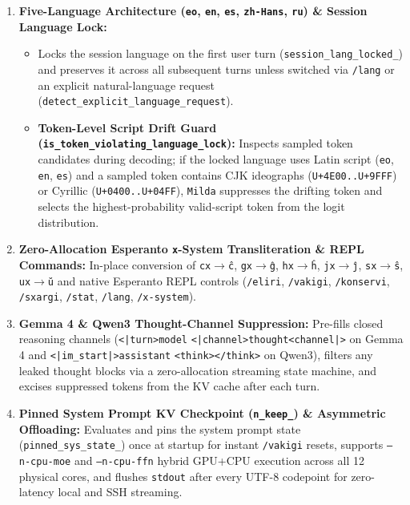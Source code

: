 \documentclass[11pt,a4paper]{article}
\begin{document}
\begin{enumerate}[leftmargin=1.5em]
  \item \textbf{Five-Language Architecture (\texttt{eo}, \texttt{en}, \texttt{es}, \texttt{zh-Hans}, \texttt{ru}) \& Session Language Lock:}
  \begin{itemize}
    \item Locks the session language on the first user turn (\texttt{session\_lang\_locked\_}) and preserves it across all subsequent turns unless switched via \texttt{/lang} or an explicit natural-language request (\texttt{detect\_explicit\_language\_request}).
    \item \textbf{Token-Level Script Drift Guard (\texttt{is\_token\_violating\_language\_lock}):} Inspects sampled token candidates during decoding; if the locked language uses Latin script (\texttt{eo}, \texttt{en}, \texttt{es}) and a sampled token contains CJK ideographs (\texttt{U+4E00..U+9FFF}) or Cyrillic (\texttt{U+0400..U+04FF}), \texttt{Milda} suppresses the drifting token and selects the highest-probability valid-script token from the logit distribution.
  \end{itemize}
  \item \textbf{Zero-Allocation Esperanto \texttt{x}-System Transliteration \& REPL Commands:} In-place conversion of \texttt{cx}$\to$\texttt{\^c}, \texttt{gx}$\to$\texttt{\^g}, \texttt{hx}$\to$\texttt{\^h}, \texttt{jx}$\to$\texttt{\^j}, \texttt{sx}$\to$\texttt{\^s}, \texttt{ux}$\to$\texttt{\u{u}} and native Esperanto REPL controls (\texttt{/eliri}, \texttt{/vakigi}, \texttt{/konservi}, \texttt{/sxargi}, \texttt{/stat}, \texttt{/lang}, \texttt{/x-system}).
  \item \textbf{Gemma 4 \& Qwen3 Thought-Channel Suppression:} Pre-fills closed reasoning channels (\texttt{<|turn>model} \texttt{<|channel>thought<channel|>} on Gemma 4 and \texttt{<|im\_start|>assistant} \texttt{<think></think>} on Qwen3), filters any leaked thought blocks via a zero-allocation streaming state machine, and excises suppressed tokens from the KV cache after each turn.
  \item \textbf{Pinned System Prompt KV Checkpoint (\texttt{n\_keep\_}) \& Asymmetric Offloading:} Evaluates and pins the system prompt state (\texttt{pinned\_sys\_state\_}) once at startup for instant \texttt{/vakigi} resets, supports \texttt{--n-cpu-moe} and \texttt{--n-cpu-ffn} hybrid GPU+CPU execution across all 12 physical cores, and flushes \texttt{stdout} after every UTF-8 codepoint for zero-latency local and SSH streaming.
\end{enumerate}
\end{document}
